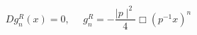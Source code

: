 \begin{equation}
D g_{n}^{R}(x)=0,~~~~~~g_{n}^{R}= -\frac{\mid p\mid^{2}}{4} \Box (p^{-1} x)^{n}
\end{equation}

